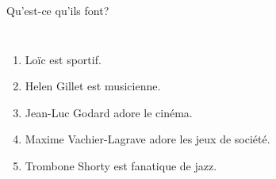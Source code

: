 \documentclass{beamer}
\begin{document}
  \begin{frame}{Qu'est-ce qu'ils font? }
    \begin{columns}
        \begin{enumerate}
          \item Loïc est sportif.
          \item<2-> Helen Gillet est musicienne.
          \item<3-> Jean-Luc Godard adore le cinéma.
          \item<4-> Maxime Vachier-Lagrave adore les jeux de société.
          \item<5-> Trombone Shorty est fanatique de jazz.
        \end{enumerate}
        \begin{minipage}[c][0.6\textheight]{\linewidth}
          \begin{center}
          \end{center}
        \end{minipage}
    \end{columns}
  \end{frame}
\end{document}
